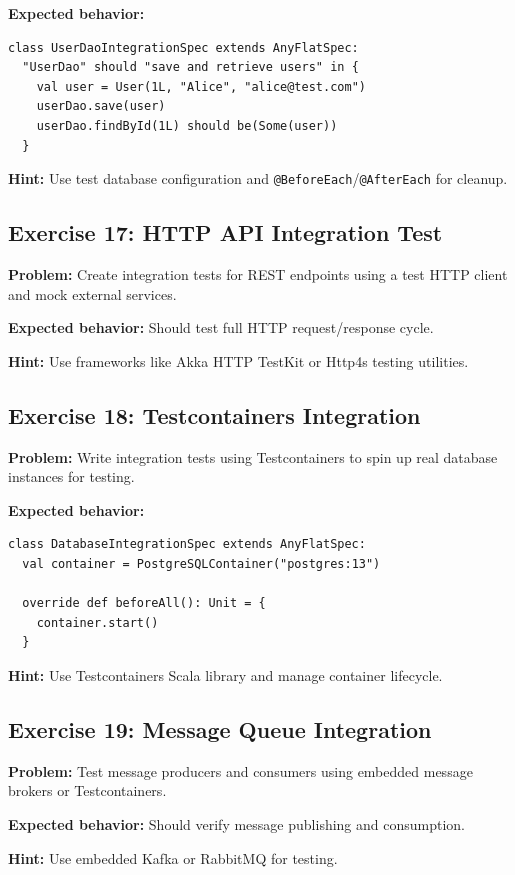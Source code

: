 \documentclass[12pt,a4paper]{article}
\begin{document}
\textbf{Expected behavior:}
\begin{lstlisting}
class UserDaoIntegrationSpec extends AnyFlatSpec:
  "UserDao" should "save and retrieve users" in {
    val user = User(1L, "Alice", "alice@test.com")
    userDao.save(user)
    userDao.findById(1L) should be(Some(user))
  }
\end{lstlisting}

\textbf{Hint:} Use test database configuration and \texttt{@BeforeEach}/\texttt{@AfterEach} for cleanup.

\subsection{Exercise 17: HTTP API Integration Test}
\textbf{Problem:} Create integration tests for REST endpoints using a test HTTP client and mock external services.

\textbf{Expected behavior:} Should test full HTTP request/response cycle.

\textbf{Hint:} Use frameworks like Akka HTTP TestKit or Http4s testing utilities.

\subsection{Exercise 18: Testcontainers Integration}
\textbf{Problem:} Write integration tests using Testcontainers to spin up real database instances for testing.

\textbf{Expected behavior:}
\begin{lstlisting}
class DatabaseIntegrationSpec extends AnyFlatSpec:
  val container = PostgreSQLContainer("postgres:13")
  
  override def beforeAll(): Unit = {
    container.start()
  }
\end{lstlisting}

\textbf{Hint:} Use Testcontainers Scala library and manage container lifecycle.

\subsection{Exercise 19: Message Queue Integration}
\textbf{Problem:} Test message producers and consumers using embedded message brokers or Testcontainers.

\textbf{Expected behavior:} Should verify message publishing and consumption.

\textbf{Hint:} Use embedded Kafka or RabbitMQ for testing.
\end{document}
